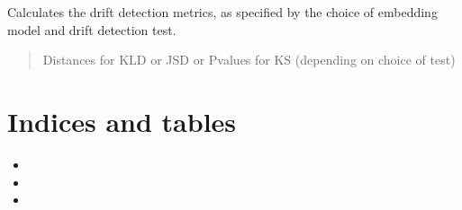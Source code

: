 \documentclass[letterpaper,10pt,english]{sphinxmanual}
\begin{document}
\begin{fulllineitems}
\begin{fulllineitems}
\end{fulllineitems}


\begin{fulllineitems}
\label{\detokenize{fldModules/myDetectors:myDetectors.myDetectors.run}}
\pysigstartsignatures
{}
\pysigstopsignatures
\sphinxAtStartPar
Calculates the drift detection metrics, as specified by the choice of embedding model and
drift detection test.
\begin{quote}\begin{description}
\sphinxAtStartPar
Distances for KLD or JSD or P\sphinxhyphen{}values for KS (depending on choice of test)

\end{description}\end{quote}

\end{fulllineitems}


\end{fulllineitems}



\chapter{Indices and tables}
\label{\detokenize{index:indices-and-tables}}\begin{itemize}
\item {} 
\sphinxAtStartPar
{}

\item {} 
\sphinxAtStartPar
{}

\item {} 
\sphinxAtStartPar
{}

\end{itemize}
\end{document}
